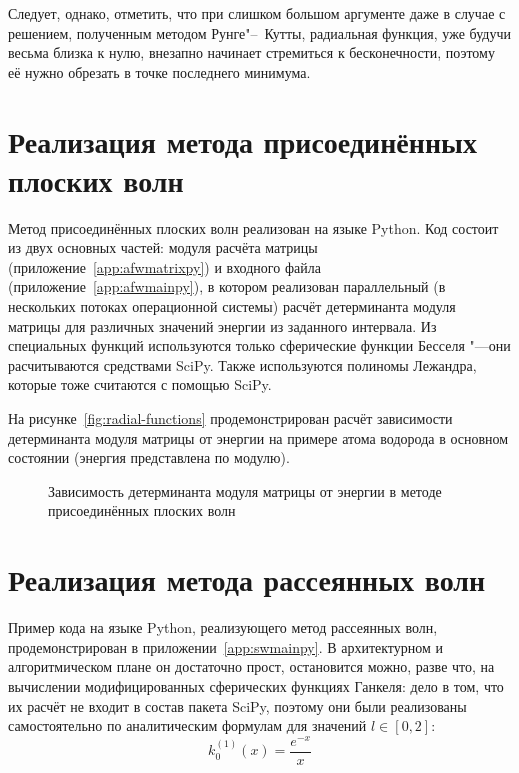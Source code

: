 Следует, однако, отметить, что при слишком большом аргументе даже в случае с решением, полученным методом Рунге"--~Кутты,
радиальная функция, уже будучи весьма близка к нулю, внезапно начинает стремиться к бесконечности, поэтому её нужно
обрезать в точке последнего минимума.

\section{\textbf{Реализация метода присоединённых плоских волн}}\label{sec:programming/afw-method}
Метод присоединённых плоских волн реализован на языке Python. Код состоит из двух основных частей: модуля расчёта
матрицы (приложение~\cref{app:afwmatrixpy}) и входного файла (приложение~\cref{app:afwmainpy}), в котором реализован
параллельный (в нескольких потоках операционной системы) расчёт детерминанта модуля матрицы для различных значений
энергии из заданного интервала. Из специальных функций используются только сферические функции Бесселя "---они
расчитываются средствами SciPy\cite{scipy-spherical}. Также используются полиномы Лежандра, которые тоже считаются
с помощью SciPy\cite{scipy-legendre}.

На рисунке~\cref{fig:radial-functions} продемонстрирован расчёт зависимости детерминанта модуля матрицы от энергии на
примере атома водорода в основном состоянии (энергия представлена по модулю).
\begin{figure}[ht]
    \caption{Зависимость детерминанта модуля матрицы от энергии в методе присоединённых плоских волн}\label{fig:afw-plot}
\end{figure}

\section{\textbf{Реализация метода рассеянных волн}}\label{sec:programming/afw-method}
Пример кода на языке Python, реализующего метод рассеянных волн, продемонстрирован в приложении~\cref{app:swmainpy}.
В архитектурном и алгоритмическом плане он достаточно прост, остановится можно, разве что, на вычислении
модифицированных сферических функциях Ганкеля: дело в том, что их расчёт не входит в состав пакета SciPy, поэтому они
были реализованы самостоятельно по аналитическим формулам для значений $l \in [0, 2]$:
\begin{equation}
  k_0^{(1)}(x) = \frac{e^{-x}}{x}
\end{equation}

